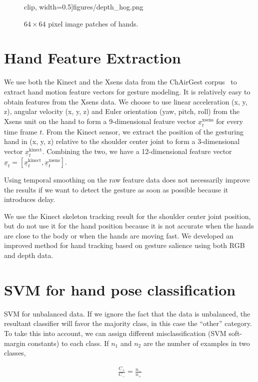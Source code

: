 \begin{figure}[h]
{  clip, width=0.5\textwidth]{figures/depth_hog.png}
  }
  \caption{$64\times64$ pixel image patches of hands.} \label{fig:hand}
\end{figure}

\section{Hand Feature Extraction}
We use both the Kinect and the Xsens data from the ChAirGest corpus~\cite{Ruffieux2013} to
extract hand motion feature vectors for gesture modeling.
It is relatively easy to obtain features from the Xsens data. We choose to use linear
acceleration (x, y, z), angular velocity (x, y, z) and Euler orientation (yaw, pitch, roll)
from the Xsens unit on the hand to form a 9-dimensional feature vector $\underline{x}_t^{\text{xsens}}$
for every time frame $t$.
From the Kinect sensor, we extract the position of the gesturing hand in (x, y, z) relative to
the shoulder center joint to
form a 3-dimensional vector $\underline{x}_t^{\text{kinect}}$. Combining the two, we
have a 12-dimensional feature vector $\underline{x}_t = [\underline{x}^\text{kinect}_t, \underline{x}^\text{xsens}_t]$.

Using temporal smoothing on the raw feature data does not necessarily improve
the results if we want to detect the gesture as soon as possible because it
introduces delay.

We use the Kinect skeleton tracking result for the shoulder center joint position,
but do not use it for the hand position because
it is not accurate when the hands are close to the body or when the hands are moving fast.
We developed an improved method for hand tracking based on gesture salience using both
RGB and depth data.

\section{SVM for hand pose classification}
SVM for unbalanced data. \cite{ben2010}
If we ignore the  fact that the data is unbalanced, the resultant classifier
will favor the majority class, in this case the ``other'' category. To take this
into account, we can assign different misclassification (SVM soft-margin
constants) to each class. If $n_1$ and $n_2$ are the number of examples in two
classes, 

\begin{align}
\frac{C_+}{C_-} = \frac{n_-}{n_+}
\end{align}

